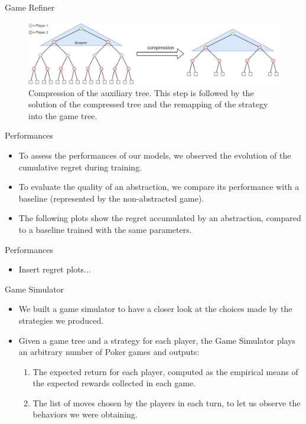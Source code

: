 \documentclass[11pt]{beamer}
\begin{document}
\begin{frame}{Game Refiner}
\begin{figure}[hbtp]
		\centering
		\includegraphics[scale=0.2]{images/img_06.png}
		\caption{Compression of the auxiliary tree. This step is followed by the solution of the compressed tree and the remapping of the strategy into the game tree.}
\end{figure}
\end{frame}

\begin{frame}{Performances}
\begin{itemize}
\item To assess the performances of our models, we observed the evolution of the cumulative regret during training.
\item To evaluate the quality of an abstraction, we compare its performance with a baseline (represented by the non-abstracted game).
\item The following plots show the regret accumulated by an abstraction, compared to a baseline trained with the same parameters.
\end{itemize}
\end{frame}

\begin{frame}{Performances}
\begin{itemize}
\item Insert regret plots...
\end{itemize}
\end{frame}

\begin{frame}{Game Simulator}
\begin{itemize}
\item We built a game simulator to have a closer look at the choices made by the strategies we produced.
\item Given a game tree and a strategy for each player, the Game Simulator plays an arbitrary number of Poker games and outputs:
\begin{enumerate}
\item The expected return for each player, computed as the empirical means of the expected rewards collected in each game.
\item The list of moves chosen by the players in each turn, to let us observe the behaviors we were obtaining.
\end{enumerate}
\end{itemize}
\end{frame}
\end{document}
